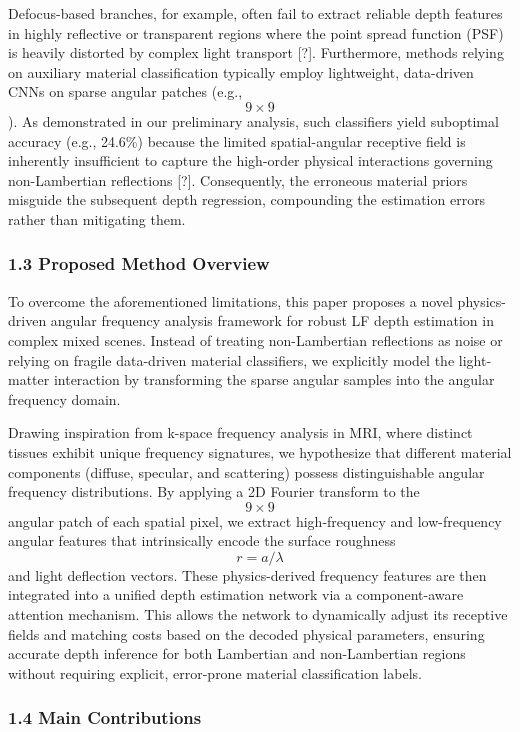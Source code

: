 \documentclass[journal]{IEEEtran}
\begin{document}
Defocus-based branches, for example, often fail to extract reliable depth features in highly reflective or transparent regions where the point spread function (PSF) is heavily distorted by complex light transport [?]. Furthermore, methods relying on auxiliary material classification typically employ lightweight, data-driven CNNs on sparse angular patches (e.g., \[
9 \times 9
\]). As demonstrated in our preliminary analysis, such classifiers yield suboptimal accuracy (e.g., 24.6\%) because the limited spatial-angular receptive field is inherently insufficient to capture the high-order physical interactions governing non-Lambertian reflections [?]. Consequently, the erroneous material priors misguide the subsequent depth regression, compounding the estimation errors rather than mitigating them.

\subsubsection{1.3 Proposed Method Overview}

To overcome the aforementioned limitations, this paper proposes a novel physics-driven angular frequency analysis framework for robust LF depth estimation in complex mixed scenes. Instead of treating non-Lambertian reflections as noise or relying on fragile data-driven material classifiers, we explicitly model the light-matter interaction by transforming the sparse angular samples into the angular frequency domain. 

Drawing inspiration from k-space frequency analysis in MRI, where distinct tissues exhibit unique frequency signatures, we hypothesize that different material components (diffuse, specular, and scattering) possess distinguishable angular frequency distributions. By applying a 2D Fourier transform to the \[
9 \times 9
\] angular patch of each spatial pixel, we extract high-frequency and low-frequency angular features that intrinsically encode the surface roughness \[
r = a/\lambda
\] and light deflection vectors. These physics-derived frequency features are then integrated into a unified depth estimation network via a component-aware attention mechanism. This allows the network to dynamically adjust its receptive fields and matching costs based on the decoded physical parameters, ensuring accurate depth inference for both Lambertian and non-Lambertian regions without requiring explicit, error-prone material classification labels.

\subsubsection{1.4 Main Contributions}
\end{document}
